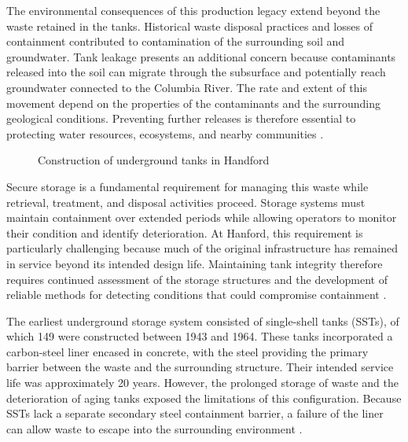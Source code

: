 The environmental consequences of this production legacy extend beyond the waste retained in the tanks. Historical waste disposal practices and losses of containment contributed to contamination of the surrounding soil and groundwater. Tank leakage presents an additional concern because contaminants released into the soil can migrate through the subsurface and potentially reach groundwater connected to the Columbia River. The rate and extent of this movement depend on the properties of the contaminants and the surrounding geological conditions. Preventing further releases is therefore essential to protecting water resources, ecosystems, and nearby communities \citep{gao2008TankManagement,ecologyHanfordLeakingTanks}.

\begin{figure}[H]
\centering
{}
\caption{Construction of underground tanks in Handford}
\label{fig:Handford tank constuction}
\end{figure}

Secure storage is a fundamental requirement for managing this waste while retrieval, treatment, and disposal activities proceed. Storage systems must maintain containment over extended periods while allowing operators to monitor their condition and identify deterioration. At Hanford, this requirement is particularly challenging because much of the original infrastructure has remained in service beyond its intended design life. Maintaining tank integrity therefore requires continued assessment of the storage structures and the development of reliable methods for detecting conditions that could compromise containment \citep{doe2020TankWasteAudit}.

The earliest underground storage system consisted of single-shell tanks (SSTs), of which 149 were constructed between 1943 and 1964. These tanks incorporated a carbon-steel liner encased in concrete, with the steel providing the primary barrier between the waste and the surrounding structure. Their intended service life was approximately 20 years. However, the prolonged storage of waste and the deterioration of aging tanks exposed the limitations of this configuration. Because SSTs lack a separate secondary steel containment barrier, a failure of the liner can allow waste to escape into the surrounding environment \citep{doe2020TankWasteAudit}.

